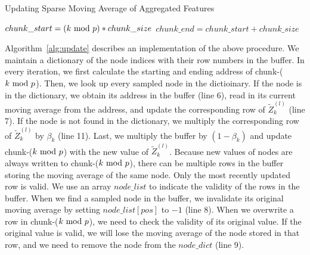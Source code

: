 \begin{algorithm}[t]
  \small
  \caption{Updating Sparse Moving Average of Aggregated Features}
  \label{alg:update}
  $chunk\_start=(k\ \mathrm{mod}\ p) * chunk\_size$\;
  $chunk\_end=chunk\_start + chunk\_size$\;
  \end{algorithm}

Algorithm~\ref{alg:update} describes an implementation of the above procedure. 
We maintain a dictionary of the node indices with their row numbers in the buffer. 
In every iteration, we first calculate the starting and ending address of chunk-($k\ \mathrm{mod}\ p$). 
Then, we look up every sampled node in the dictioinary. 
If the node is in the dictionary, we obtain its address in the buffer (line 6), read in its current moving average from the address, and update the corresponding row of $\widetilde{Z}_k^{(l)}$ (line 7). 
If the node is not found in the dictionary, we multiply the corresponding row of $\widetilde{Z}_k^{(l)}$ by $\beta_k$ (line 11). 
Last, we multiply the buffer by $(1-\beta_k)$ and update chunk-($k\ \mathrm{mod}\ p$) with the new value of $\widetilde{Z}_k^{(l)}$.  
Because new values of nodes are always written to chunk-($k\ \mathrm{mod}\ p$), there can be multiple rows in the buffer storing the moving average of the same node. 
Only the most recently updated row is valid. 
We use an array $node\_list$ to indicate the validity of the rows in the buffer. 
When we find a sampled node in the buffer, we invalidate its original moving average by setting $node\_list[pos]$ to $-1$ (line 8). 
When we overwrite a row in chunk-($k\ \mathrm{mod}\ p$), we need to check the validity of its original value. 
If the original value is valid, we will lose the moving average of the node stored in that row, and we need to remove the node from the $node\_dict$ (line 9). 

